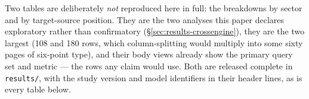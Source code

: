 \documentclass[11pt,a4paper]{article}
\begin{document}
Two tables are deliberately \emph{not} reproduced here in full: the
breakdowns by sector and by target-source position. They are the two
analyses this paper declares exploratory rather than confirmatory
(\S\ref{sec:results-crossengine}), they are the two largest (108 and 180
rows, which column-splitting would multiply into some sixty pages of
six-point type), and their body views already show the primary query set and
metric --- the rows any claim would use. Both are released complete in
\texttt{results/}, with the study version and model identifiers in their
header lines, as is every table below.













\end{document}
